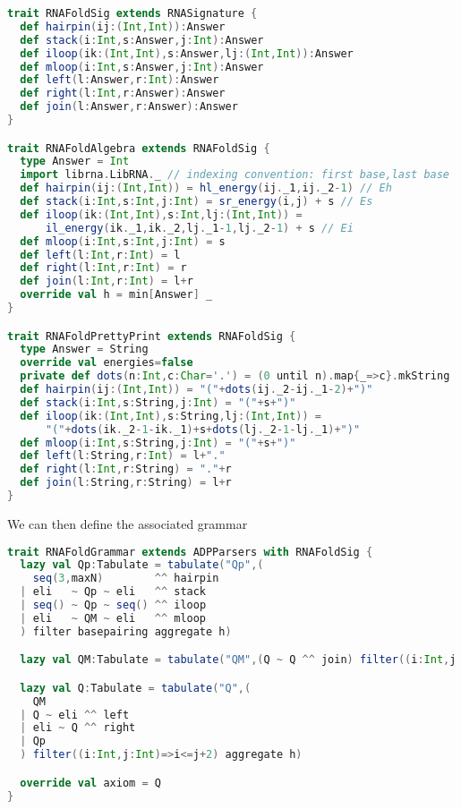 \begin{lstlisting}[language=Scala,captionpos=none]
trait RNAFoldSig extends RNASignature {
  def hairpin(ij:(Int,Int)):Answer
  def stack(i:Int,s:Answer,j:Int):Answer
  def iloop(ik:(Int,Int),s:Answer,lj:(Int,Int)):Answer
  def mloop(i:Int,s:Answer,j:Int):Answer
  def left(l:Answer,r:Int):Answer
  def right(l:Int,r:Answer):Answer
  def join(l:Answer,r:Answer):Answer
}

trait RNAFoldAlgebra extends RNAFoldSig {
  type Answer = Int
  import librna.LibRNA._ // indexing convention: first base,last base
  def hairpin(ij:(Int,Int)) = hl_energy(ij._1,ij._2-1) // Eh
  def stack(i:Int,s:Int,j:Int) = sr_energy(i,j) + s // Es
  def iloop(ik:(Int,Int),s:Int,lj:(Int,Int)) =
      il_energy(ik._1,ik._2,lj._1-1,lj._2-1) + s // Ei
  def mloop(i:Int,s:Int,j:Int) = s
  def left(l:Int,r:Int) = l
  def right(l:Int,r:Int) = r
  def join(l:Int,r:Int) = l+r
  override val h = min[Answer] _
}

trait RNAFoldPrettyPrint extends RNAFoldSig {
  type Answer = String
  override val energies=false
  private def dots(n:Int,c:Char='.') = (0 until n).map{_=>c}.mkString
  def hairpin(ij:(Int,Int)) = "("+dots(ij._2-ij._1-2)+")"
  def stack(i:Int,s:String,j:Int) = "("+s+")"
  def iloop(ik:(Int,Int),s:String,lj:(Int,Int)) =
      "("+dots(ik._2-1-ik._1)+s+dots(lj._2-1-lj._1)+")"
  def mloop(i:Int,s:String,j:Int) = "("+s+")"
  def left(l:String,r:Int) = l+"."
  def right(l:Int,r:String) = "."+r
  def join(l:String,r:String) = l+r
}
\end{lstlisting}

\newpage
We can then define the associated grammar
\begin{lstlisting}[language=Scala,captionpos=none]
trait RNAFoldGrammar extends ADPParsers with RNAFoldSig {
  lazy val Qp:Tabulate = tabulate("Qp",(
    seq(3,maxN)        ^^ hairpin
  | eli   ~ Qp ~ eli   ^^ stack
  | seq() ~ Qp ~ seq() ^^ iloop
  | eli   ~ QM ~ eli   ^^ mloop
  ) filter basepairing aggregate h)

  lazy val QM:Tabulate = tabulate("QM",(Q ~ Q ^^ join) filter((i:Int,j:Int)=>i<=j+4) aggregate h)

  lazy val Q:Tabulate = tabulate("Q",(
    QM
  | Q ~ eli ^^ left
  | eli ~ Q ^^ right
  | Qp
  ) filter((i:Int,j:Int)=>i<=j+2) aggregate h)

  override val axiom = Q
}
\end{lstlisting}

